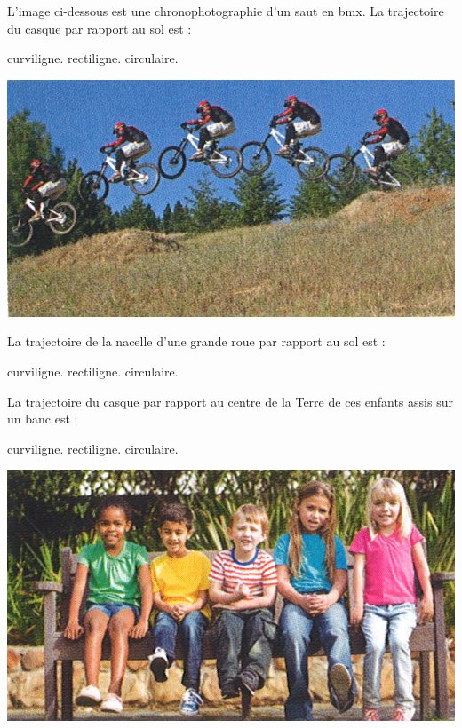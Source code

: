 \begin{questions}
	\begin{multicols}{2}
		\question[\half] L'image ci-dessous est une chronophotographie d'un saut en bmx. La trajectoire du casque par rapport au sol est :
	\begin{checkboxes}
		\correctchoice curviligne.
		\choice rectiligne.
		\choice circulaire.
	\end{checkboxes}

	
	\begin{center}
		\includegraphics[scale=0.3]{bmx}
	\end{center}

	\end{multicols}
	\question[\half] La trajectoire de la nacelle d'une grande roue par rapport au sol est :\\
	\begin{oneparcheckboxes}
		\choice curviligne.
		\choice rectiligne.
		\correctchoice circulaire.
	\end{oneparcheckboxes}
	
	
	\begin{multicols}{2}
		\question[\half] La trajectoire du casque par rapport au centre de la Terre de ces enfants assis sur un banc est :
	\begin{checkboxes}
		\choice curviligne.
		\choice rectiligne.
		\correctchoice circulaire.
	\end{checkboxes}

	\begin{center}
		\includegraphics[scale=0.3]{banc}
	\end{center}
	\end{multicols}
\end{questions}